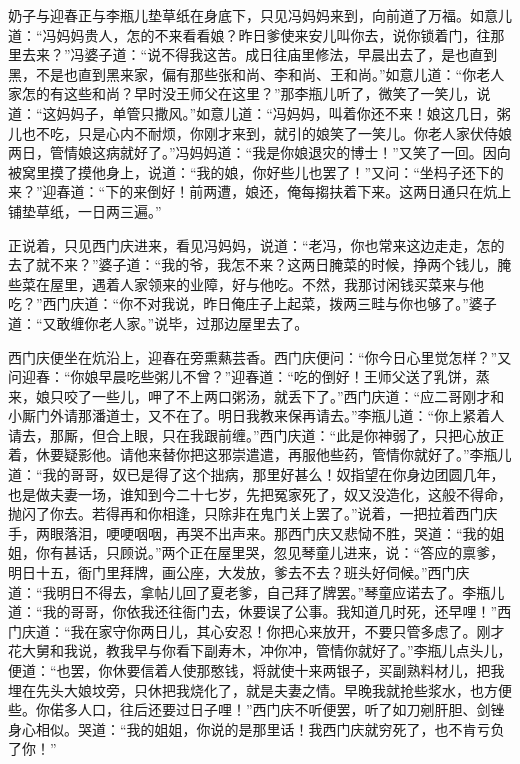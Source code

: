 奶子与迎春正与李瓶儿垫草纸在身底下，只见冯妈妈来到，向前道了万福。如意儿道：“冯妈妈贵人，怎的不来看看娘？昨日爹使来安儿叫你去，说你锁着门，往那里去来？”冯婆子道：“说不得我这苦。成日往庙里修法，早晨出去了，是也直到黑，不是也直到黑来家，偏有那些张和尚、李和尚、王和尚。”如意儿道：“你老人家怎的有这些和尚？早时没王师父在这里？”那李瓶儿听了，微笑了一笑儿，说道：“这妈妈子，单管只撒风。”如意儿道：“冯妈妈，叫着你还不来！娘这几日，粥儿也不吃，只是心内不耐烦，你刚才来到，就引的娘笑了一笑儿。你老人家伏侍娘两日，管情娘这病就好了。”冯妈妈道：“我是你娘退灾的博士！”又笑了一回。因向被窝里摸了摸他身上，说道：“我的娘，你好些儿也罢了！”又问：“坐杩子还下的来？”迎春道：“下的来倒好！前两遭，娘还，俺每搊扶着下来。这两日通只在炕上铺垫草纸，一日两三遍。”

正说着，只见西门庆进来，看见冯妈妈，说道：“老冯，你也常来这边走走，怎的去了就不来？”婆子道：“我的爷，我怎不来？这两日腌菜的时候，挣两个钱儿，腌些菜在屋里，遇着人家领来的业障，好与他吃。不然，我那讨闲钱买菜来与他吃？”西门庆道：“你不对我说，昨日俺庄子上起菜，拨两三畦与你也够了。”婆子道：“又敢缠你老人家。”说毕，过那边屋里去了。

西门庆便坐在炕沿上，迎春在旁熏爇芸香。西门庆便问：“你今日心里觉怎样？”又问迎春：“你娘早晨吃些粥儿不曾？”迎春道：“吃的倒好！王师父送了乳饼，蒸来，娘只咬了一些儿，呷了不上两口粥汤，就丢下了。”西门庆道：“应二哥刚才和小厮门外请那潘道士，又不在了。明日我教来保再请去。”李瓶儿道：“你上紧着人请去，那厮，但合上眼，只在我跟前缠。”西门庆道：“此是你神弱了，只把心放正着，休要疑影他。请他来替你把这邪崇遣遣，再服他些药，管情你就好了。”李瓶儿道：“我的哥哥，奴已是得了这个拙病，那里好甚么！奴指望在你身边团圆几年，也是做夫妻一场，谁知到今二十七岁，先把冤家死了，奴又没造化，这般不得命，抛闪了你去。若得再和你相逢，只除非在鬼门关上罢了。”说着，一把拉着西门庆手，两眼落泪，哽哽咽咽，再哭不出声来。那西门庆又悲恸不胜，哭道：“我的姐姐，你有甚话，只顾说。”两个正在屋里哭，忽见琴童儿进来，说：“答应的禀爹，明日十五，衙门里拜牌，画公座，大发放，爹去不去？班头好伺候。”西门庆道：“我明日不得去，拿帖儿回了夏老爹，自己拜了牌罢。”琴童应诺去了。李瓶儿道：“我的哥哥，你依我还往衙门去，休要误了公事。我知道几时死，还早哩！”西门庆道：“我在家守你两日儿，其心安忍！你把心来放开，不要只管多虑了。刚才花大舅和我说，教我早与你看下副寿木，冲你冲，管情你就好了。”李瓶儿点头儿，便道：“也罢，你休要信着人使那憨钱，将就使十来两银子，买副熟料材儿，把我埋在先头大娘坟旁，只休把我烧化了，就是夫妻之情。早晚我就抢些浆水，也方便些。你偌多人口，往后还要过日子哩！”西门庆不听便罢，听了如刀剜肝胆、剑锉身心相似。哭道：“我的姐姐，你说的是那里话！我西门庆就穷死了，也不肯亏负了你！”


